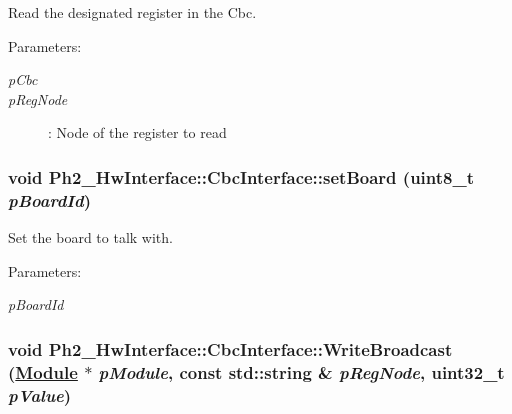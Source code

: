 Read the designated register in the Cbc. 

\begin{Desc}
\item[Parameters:]
\begin{description}
\item[{\em p\-Cbc}]\item[{\em p\-Reg\-Node}]: Node of the register to read \end{description}
\end{Desc}
\hypertarget{class_ph2___hw_interface_1_1_cbc_interface_39fac7185fffec4462d31d324ea9a54a}{
\subsubsection[setBoard]{\setlength{\rightskip}{0pt plus 5cm}void Ph2\_\-Hw\-Interface::Cbc\-Interface::set\-Board (uint8\_\-t {\em p\-Board\-Id})}}
\label{class_ph2___hw_interface_1_1_cbc_interface_39fac7185fffec4462d31d324ea9a54a}


Set the board to talk with. 

\begin{Desc}
\item[Parameters:]
\begin{description}
\item[{\em p\-Board\-Id}]\end{description}
\end{Desc}
\hypertarget{class_ph2___hw_interface_1_1_cbc_interface_81a03fe5d5d0791ff1b2cab92f6fbcdd}{
\subsubsection[WriteBroadcast]{\setlength{\rightskip}{0pt plus 5cm}void Ph2\_\-Hw\-Interface::Cbc\-Interface::Write\-Broadcast (\hyperlink{class_ph2___hw_description_1_1_module}{Module} $\ast$ {\em p\-Module}, const std::string \& {\em p\-Reg\-Node}, uint32\_\-t {\em p\-Value})}}
\label{class_ph2___hw_interface_1_1_cbc_interface_81a03fe5d5d0791ff1b2cab92f6fbcdd}


